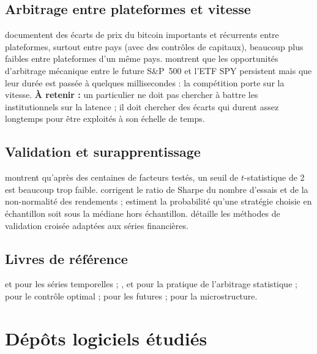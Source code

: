 \documentclass[11pt,a4paper]{article}
\begin{document}
\subsection{Arbitrage entre plateformes et vitesse}

\citet{makarov2020} documentent des écarts de prix du bitcoin importants et récurrents entre plateformes, surtout entre pays (avec des contrôles de capitaux), beaucoup plus faibles entre plateformes d'un même pays. \citet{budish2015} montrent que les opportunités d'arbitrage mécanique entre le future S\&P~500 et l'ETF SPY persistent mais que leur durée est passée à quelques millisecondes : la compétition porte sur la vitesse. \textbf{À retenir :} un particulier ne doit pas chercher à battre les institutionnels sur la latence ; il doit chercher des écarts qui durent assez longtemps pour être exploités à son échelle de temps.

\subsection{Validation et surapprentissage}

\citet{harvey2016} montrent qu'après des centaines de \og facteurs\fg{} testés, un seuil de $t$-statistique de 2 est beaucoup trop faible. \citet{bailey2014dsr} corrigent le ratio de Sharpe du nombre d'essais et de la non-normalité des rendements ; \citet{bailey2017pbo} estiment la probabilité qu'une stratégie choisie en échantillon soit sous la médiane hors échantillon. \citet{lopezdeprado2018} détaille les méthodes de validation croisée adaptées aux séries financières.

\subsection{Livres de référence}

\citet{hamilton1994} et \citet{tsay2010} pour les séries temporelles ; \citet{vidyamurthy2004}, \citet{pole2007} et \citet{chan2013} pour la pratique de l'arbitrage statistique ; \citet{leungli2016} pour le contrôle optimal ; \citet{hull2022} pour les futures ; \citet{harris2003} pour la microstructure.

\section{Dépôts logiciels étudiés}
\end{document}
